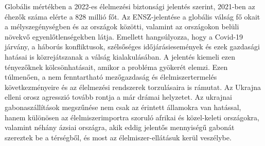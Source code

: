 \documentclass[a4paper,oneside,onecolumn,12pt]{LegrandOrangeBook}
\begin{document}
	Globális mértékben a 2022-es élelmezési biztonsági jelentés szerint, 2021-ben az éhezők száma elérte a 828 millió főt. Az ENSZ-jelentése a globális válság fő okait a mélyszegénységben és az országok közötti, valamint az országokon belüli növekvő egyenlőtlenségekben látja. Emellett hangsúlyozza, hogy a Covid-19 járvány, a háborús konfliktusok, szélsőséges időjárásiesemények és ezek gazdasági hatásai is közrejátszanak a válság kialakulásában. A jelentés kiemeli ezen tényezőknek kölcsönhatásait, amikor a probléma gyökerét elemzi. 
Ezen túlmenően, a nem fenntartható mezőgazdaság és élelmiszertermelés következményeire és az élelmezési rendszerek torzulásaira is rámutat. Az Ukrajna elleni orosz agresszió tovább rontja a már drámai helyzetet. Az ukrajnai gabonaszállítások megszűnése nem csak az érintett államokra van hatással, hanem különösen az élelmiszerimportra szoruló afrikai és közel-keleti országokra, valamint néhány ázsiai országra, akik eddig jelentős mennyiségű gabonát szereztek be a térségből, és most az élelmiszer-ellátásuk kerül veszélybe.
\end{document}
